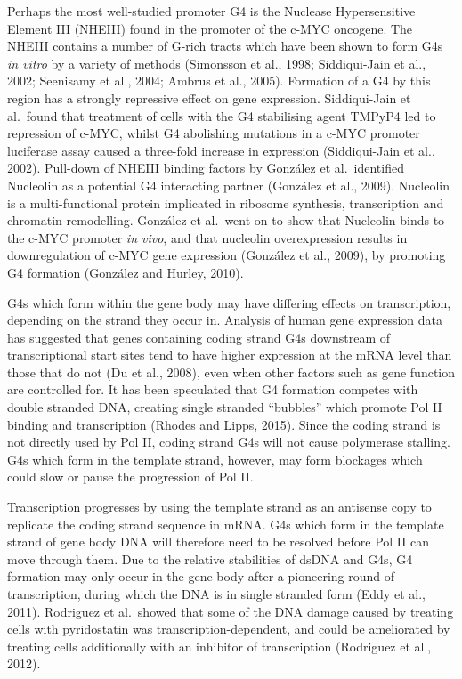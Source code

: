 \documentclass[12pt,a4paper,]{report}
\begin{document}
Perhaps the most well-studied promoter G4 is the Nuclease Hypersensitive
Element III (NHEIII) found in the promoter of the c-MYC oncogene. The
NHEIII contains a number of G-rich tracts which have been shown to form
G4s \emph{in vitro} by a variety of methods (Simonsson et al., 1998;
Siddiqui-Jain et al., 2002; Seenisamy et al., 2004; Ambrus et al.,
2005). Formation of a G4 by this region has a strongly repressive effect
on gene expression. Siddiqui-Jain et al.~found that treatment of cells
with the G4 stabilising agent TMPyP4 led to repression of c-MYC, whilst
G4 abolishing mutations in a c-MYC promoter luciferase assay caused a
three-fold increase in expression (Siddiqui-Jain et al., 2002).
Pull-down of NHEIII binding factors by González et al.~identified
Nucleolin as a potential G4 interacting partner (González et al., 2009).
Nucleolin is a multi-functional protein implicated in ribosome
synthesis, transcription and chromatin remodelling. González et al.~went
on to show that Nucleolin binds to the c-MYC promoter \emph{in vivo},
and that nucleolin overexpression results in downregulation of c-MYC
gene expression (González et al., 2009), by promoting G4 formation
(González and Hurley, 2010).

G4s which form within the gene body may have differing effects on
transcription, depending on the strand they occur in. Analysis of human
gene expression data has suggested that genes containing coding strand
G4s downstream of transcriptional start sites tend to have higher
expression at the mRNA level than those that do not (Du et al., 2008),
even when other factors such as gene function are controlled for. It has
been speculated that G4 formation competes with double stranded DNA,
creating single stranded ``bubbles'' which promote Pol II binding and
transcription (Rhodes and Lipps, 2015). Since the coding strand is not
directly used by Pol II, coding strand G4s will not cause polymerase
stalling. G4s which form in the template strand, however, may form
blockages which could slow or pause the progression of Pol II.

Transcription progresses by using the template strand as an antisense
copy to replicate the coding strand sequence in mRNA. G4s which form in
the template strand of gene body DNA will therefore need to be resolved
before Pol II can move through them. Due to the relative stabilities of
dsDNA and G4s, G4 formation may only occur in the gene body after a
pioneering round of transcription, during which the DNA is in single
stranded form (Eddy et al., 2011). Rodriguez et al.~showed that some of
the DNA damage caused by treating cells with pyridostatin was
transcription-dependent, and could be ameliorated by treating cells
additionally with an inhibitor of transcription (Rodriguez et al.,
2012).
\end{document}
